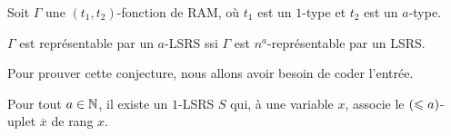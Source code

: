 	\begin{theorem}
		\label{thm:rep_a_LSRS_rep_na_LSRS}
		Soit $\Gamma$ une $(t_1,t_2)$-fonction de RAM, où $t_1$ est un $1$-type et $t_2$ est un $a$-type.
		
		$\Gamma$ est représentable par un $a$-LSRS ssi $\Gamma$ est $n^a$-représentable par un LSRS.
	\end{theorem}
		
	Pour prouver cette conjecture, nous allons avoir besoin de coder l'entrée.
	
	\begin{lemma}
		\label{lem:decomp_rang_par_LSRS}
		
		Pour tout $a \in \mathbb{N}$, il existe un $1$-LSRS $S$ qui, à une variable $x$, associe le $\left( \leqslant a \right)$-uplet $\overline{x}$ de rang $x$. 
	\end{lemma}
		

